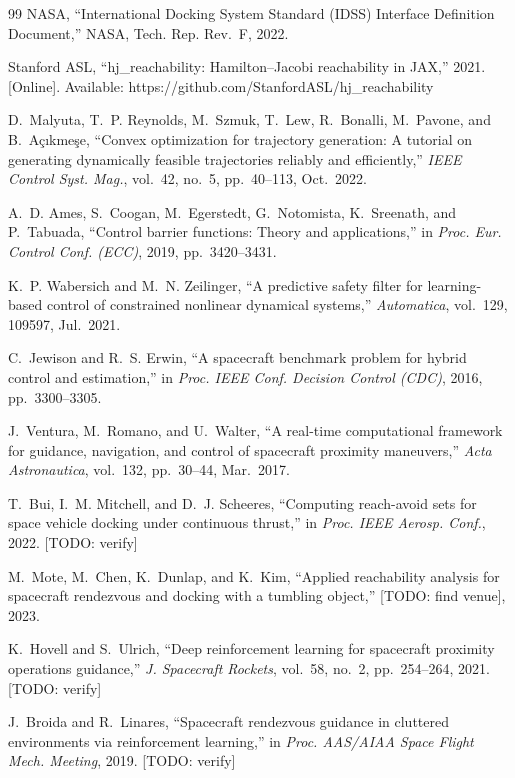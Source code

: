 \documentclass[letterpaper, 10 pt, conference]{ieeeconf}
\begin{document}
\begin{thebibliography}{99}
NASA, ``International Docking System Standard (IDSS) Interface Definition Document,'' NASA, Tech. Rep. Rev.~F, 2022.

Stanford ASL, ``hj\_reachability: Hamilton--Jacobi reachability in JAX,'' 2021. [Online]. Available: https://github.com/StanfordASL/hj\_reachability

D.~Malyuta, T.~P. Reynolds, M.~Szmuk, T.~Lew, R.~Bonalli, M.~Pavone, and B.~A\c{c}{\i}kme\c{s}e, ``Convex optimization for trajectory generation: A tutorial on generating dynamically feasible trajectories reliably and efficiently,'' \emph{IEEE Control Syst. Mag.}, vol.~42, no.~5, pp.~40--113, Oct.~2022.

A.~D. Ames, S.~Coogan, M.~Egerstedt, G.~Notomista, K.~Sreenath, and P.~Tabuada, ``Control barrier functions: Theory and applications,'' in \emph{Proc. Eur. Control Conf. (ECC)}, 2019, pp.~3420--3431.

K.~P. Wabersich and M.~N. Zeilinger, ``A predictive safety filter for learning-based control of constrained nonlinear dynamical systems,'' \emph{Automatica}, vol.~129, 109597, Jul.~2021.

C.~Jewison and R.~S. Erwin, ``A spacecraft benchmark problem for hybrid control and estimation,'' in \emph{Proc. IEEE Conf. Decision Control (CDC)}, 2016, pp.~3300--3305.

J.~Ventura, M.~Romano, and U.~Walter, ``A real-time computational framework for guidance, navigation, and control of spacecraft proximity maneuvers,'' \emph{Acta Astronautica}, vol.~132, pp.~30--44, Mar.~2017.

T.~Bui, I.~M. Mitchell, and D.~J. Scheeres, ``Computing reach-avoid sets for space vehicle docking under continuous thrust,'' in \emph{Proc. IEEE Aerosp. Conf.}, 2022. [TODO: verify]

M.~Mote, M.~Chen, K.~Dunlap, and K.~Kim, ``Applied reachability analysis for spacecraft rendezvous and docking with a tumbling object,'' [TODO: find venue], 2023.

K.~Hovell and S.~Ulrich, ``Deep reinforcement learning for spacecraft proximity operations guidance,'' \emph{J. Spacecraft Rockets}, vol.~58, no.~2, pp.~254--264, 2021. [TODO: verify]

J.~Broida and R.~Linares, ``Spacecraft rendezvous guidance in cluttered environments via reinforcement learning,'' in \emph{Proc. AAS/AIAA Space Flight Mech. Meeting}, 2019. [TODO: verify]


\end{thebibliography}
\end{document}

